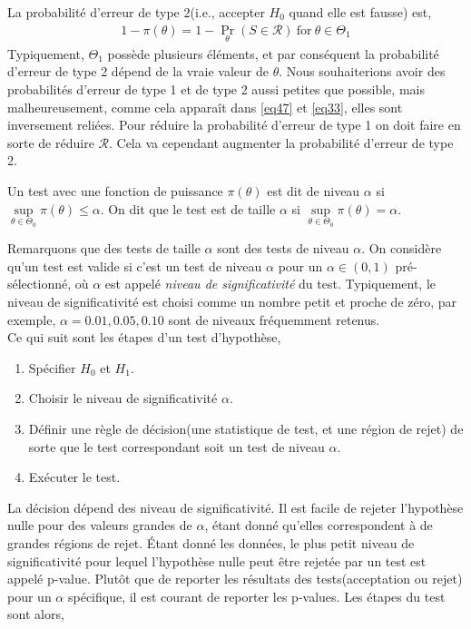 La probabilité d'erreur de type 2(i.e., accepter $H_0$ quand elle est fausse) est,
\begin{align}
1 -\pi(\theta) = 1 - \Pr_\theta(S\in\mathcal{R}) \ \textrm{for} \ \theta\in \Theta_1
\label{eq33}
\end{align}
Typiquement, $\Theta_1$ possède plusieurs éléments, et par conséquent la probabilité d'erreur de type 2 dépend de la vraie valeur de $\theta$. Nous souhaiterions avoir des probabilités d'erreur de type 1 et de type 2 aussi petites que possible, mais malheureusement, comme cela apparaît dans \eqref{eq47} et \eqref{eq33}, elles sont inversement reliées. Pour réduire la probabilité d'erreur de type 1 on doit faire en sorte de réduire $\mathcal{R}$. Cela va cependant augmenter la probabilité d'erreur de type 2.
\begin{definition}
Un test avec une fonction de puissance $\pi(\theta)$ est dit de niveau $\alpha$ si $\underset{\theta\in\Theta_0}{\sup} \pi(\theta) \leq \alpha$. On dit que le test est de taille $\alpha$ si $\underset{\theta\in\Theta_0}{\sup} \pi(\theta) = \alpha$.
\label{de1}
\end{definition} 
Remarquons que des tests de taille $\alpha$ sont des tests de niveau $\alpha$. On considère qu'un test est valide si c'est un test de niveau $\alpha$ pour un $\alpha\in (0,1)$ pré-sélectionné, où $\alpha$ est appelé \emph{niveau de significativité} du test. Typiquement, le niveau de significativité est choisi comme un nombre petit et proche de zéro, par exemple, $\alpha = 0.01, 0.05, 0.10$ sont de niveaux fréquemment  retenus.\\
Ce qui suit sont les étapes d'un test d'hypothèse,
\begin{enumerate}
\item Spécifier $H_0$ et $H_1$.
\item Choisir le niveau de significativité $\alpha$.
\item Définir une règle de décision(une statistique de test, et une région de rejet) de sorte que le test correspondant soit un test de niveau $\alpha$.
\item Exécuter le test.
\end{enumerate}
La décision dépend des niveau de significativité. Il est facile de rejeter l'hypothèse nulle pour des valeurs grandes de $\alpha$, étant donné qu'elles correspondent à de grandes régions de rejet. \'Etant donné les données, le plus petit niveau de significativité pour lequel l'hypothèse nulle peut être rejetée par un test est appelé p-value. Plutôt que de reporter les résultats des tests(acceptation ou rejet) pour un $\alpha$ spécifique, il est courant de reporter les p-values. Les étapes du test sont alors,
